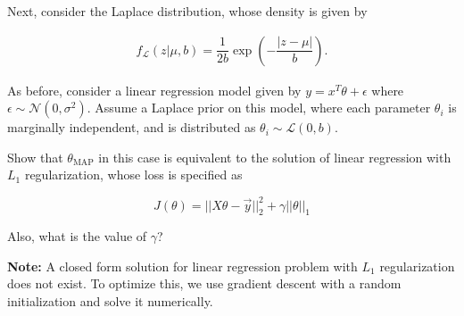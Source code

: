 \item {} Next, consider the Laplace distribution, whose density is
given by

\begin{align*}
  f_{\mathcal{L}}(z|\mu ,b)={\dfrac{1}{2b}}
  \exp \left(-{\dfrac{|z-\mu |}{b}}\right).
\end{align*}


As before, consider a linear regression model given by
$y=x^T\theta+\epsilon$ where $\epsilon \sim \mathcal{N}(0,\sigma^2)$. Assume a Laplace
prior on this model, where each parameter $\theta_i$ is marginally independent, and
is distributed as $\theta_i \sim \mathcal{L}(0,b)$.

Show that $\theta_\text{MAP}$ in this case is equivalent to the solution of linear
regression with $L_1$ regularization, whose loss is specified as

$$J(\theta) = || X\theta - \vec{y} ||_2^2 + \gamma ||\theta||_1 $$

Also, what is the value of $\gamma$?

\textbf{Note:} A closed form solution for linear regression problem with $L_1$ regularization
does not exist. To optimize this, we use gradient descent with a random initialization
and solve it numerically.
